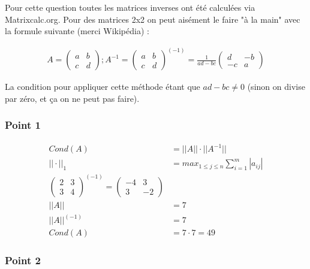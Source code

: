 Pour cette question toutes les matrices inverses ont été calculées via Matrixcalc.org. Pour des matrices 2x2 on peut aisément le faire "à la main" avec la formule suivante (merci Wikipédia) :

\begin{equation}
	\begin{aligned}
		A = 
		\begin{pmatrix}
			a & b\\
			c & d
		\end{pmatrix}; A^{-1} = 
		\begin{pmatrix}
			a & b\\
			c & d
		\end{pmatrix}^{(-1)} = 
		\frac{1}{ad-bc}
		\begin{pmatrix}
			d & -b\\
			-c & a
		\end{pmatrix}
	\end{aligned}
\end{equation}

La condition pour appliquer cette méthode étant que $ad - bc \neq 0$ (sinon on divise par zéro, et ça on ne peut pas faire).

\subsubsection{Point 1}

\begin{equation}
	\begin{aligned}
		Cond (A) &= ||A|| \cdot ||A^{-1}||\\
		||\cdot||_1 &= max_{1 \leq j \leq n} \sum_{i=1}^m|a_{ij}|\\
		\begin{pmatrix}
			2 & 3\\
			3 & 4
		\end{pmatrix}^{(-1)} = 
		\begin{pmatrix}
			-4 & 3\\
			3 & -2
		\end{pmatrix}\\
			||A|| &= 7\\
			||A||^{(-1)} &= 7\\
			Cond (A) &= 7 \cdot 7 = 49
	\end{aligned}
\end{equation}

\subsubsection{Point 2}

